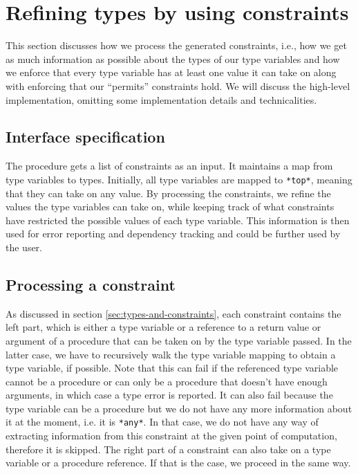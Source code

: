 \documentclass[a4paper]{article}
\begin{document}
\section{Refining types by using constraints}

This section discusses how we process the generated constraints, i.e., how
we get as much information as possible about the types of our type variables 
and how we enforce that every type variable has at least one value it can 
take on along with enforcing that our ``permits'' constraints hold.  We will 
discuss the high-level implementation, omitting some implementation details 
and technicalities.

\subsection{Interface specification}
The procedure gets a list of constraints as an input.
It maintains a map from type variables to types.
Initially, all type variables are mapped to \texttt{*top*},
meaning that they can take on any value.
By processing the constraints, we refine the values the type variables can take on,
while keeping track of what constraints have restricted the possible values of each
type variable.
This information is then used for error reporting and dependency tracking and could be
further used by the user.

\subsection{Processing a constraint}

As discussed in section \ref{sec:types-and-constraints},
each constraint contains the left part, which is either a type variable
or a reference to a return value or argument of a procedure that can be taken on by the
type variable passed.
In the latter case, we have to recursively walk the type variable
mapping to obtain a type variable, if possible.
Note that this can fail if the referenced type variable cannot be a procedure
or can only be a procedure that doesn't have enough arguments, in which
case a type error is reported.
It can also fail because the type variable can be a procedure
but we do not have any more information about it at the moment, i.e. it is 
\texttt{*any*}.
In that case, we do not have any way of extracting information from this constraint
at the given point of computation, therefore it is skipped.
The right part of a constraint can also take on a type variable or a procedure reference.
If that is the case, we proceed in the same way.\\
\end{document}
